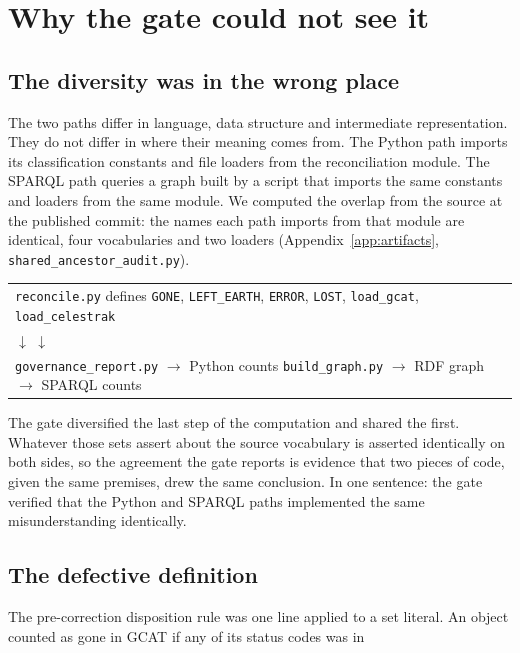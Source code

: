 \section{Why the gate could not see it}
\label{sec:mechanism}

\subsection{The diversity was in the wrong place}

The two paths differ in language, data structure and intermediate
representation. They do not differ in where their meaning comes from. The Python
path imports its classification constants and file loaders from the
reconciliation module. The SPARQL path queries a graph built by a script that
imports the same constants and loaders from the same module. We computed the
overlap from the source at the published commit: the names each path imports
from that module are identical, four vocabularies and two loaders
(Appendix~\ref{app:artifacts}, \texttt{shared\_ancestor\_audit.py}).

\begin{center}\small
\begin{tabular}{l}
\texttt{reconcile.py} defines \texttt{GONE}, \texttt{LEFT\_EARTH},
\texttt{ERROR}, \texttt{LOST}, \texttt{load\_gcat}, \texttt{load\_celestrak} \\
$\downarrow$ \hfill $\downarrow$ \\
\texttt{governance\_report.py} $\rightarrow$ Python counts \hfill
\texttt{build\_graph.py} $\rightarrow$ RDF graph $\rightarrow$ SPARQL counts \\
\end{tabular}
\end{center}

The gate diversified the last step of the computation and shared the first.
Whatever those sets assert about the source vocabulary is asserted identically on
both sides, so the agreement the gate reports is evidence that two pieces of
code, given the same premises, drew the same conclusion. In one sentence: the
gate verified that the Python and SPARQL paths implemented the same
misunderstanding identically.

\subsection{The defective definition}

The pre-correction disposition rule was one line applied to a set literal. An
object counted as gone in GCAT if any of its status codes was in

